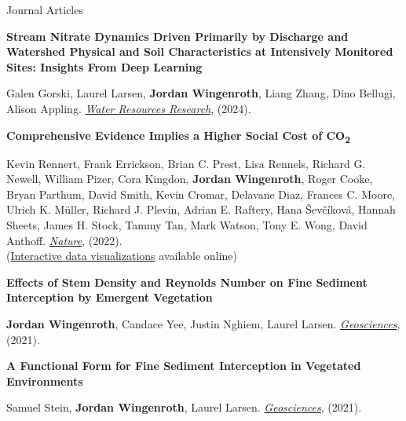 \documentclass{resume} %
\begin{document}
\begin{rSection}{Journal Articles}

{\bf Stream Nitrate Dynamics Driven Primarily by Discharge and Watershed Physical and Soil Characteristics at Intensively Monitored Sites: Insights From Deep Learning}
\vspace{-7pt}
\begin{adjustwidth}{12pt}{}
{\small Galen Gorski, Laurel Larsen, \textbf{Jordan Wingenroth}, Liang Zhang, Dino Bellugi, Alison Appling. \textit{\href{https://agupubs.onlinelibrary.wiley.com/doi/full/10.1029/2023WR036591}{Water Resources Research}}, (2024).}
\end{adjustwidth}

{\bf Comprehensive Evidence Implies a Higher Social Cost of CO\textsubscript{2}}
\vspace{-7pt}
\begin{adjustwidth}{12pt}{}
{\small Kevin Rennert, Frank Errickson, Brian C. Prest, Lisa Rennels, Richard G. Newell, William Pizer, Cora Kingdon, \textbf{Jordan Wingenroth}, Roger Cooke, Bryan Parthum, David Smith, Kevin Cromar, Delavane Diaz, Frances C. Moore, Ulrich K. M\"{u}ller, Richard J. Plevin, Adrian E. Raftery, Hana \v{S}ev\v{c}\'{i}kov\'{a}, Hannah Sheets, James H. Stock, Tammy Tan, Mark Watson, Tony E. Wong, David Anthoff. \textit{\href{https://www.nature.com/articles/s41586-022-05224-9}{Nature}}, (2022).\\
(\href{https://www.rff.org/publications/data-tools/scc-explorer/}{Interactive data visualizations} available online)}
\end{adjustwidth}

{\bf Effects of Stem Density and Reynolds Number on Fine Sediment Interception by Emergent Vegetation}
\vspace{-7pt}
\begin{adjustwidth}{12pt}{}
{\small \textbf{Jordan Wingenroth}, Candace Yee, Justin Nghiem, Laurel Larsen. \textit{\href{https://www.mdpi.com/2076-3263/11/3/136}{Geosciences}}, (2021).}
\end{adjustwidth}

{\bf A Functional Form for Fine Sediment Interception in Vegetated Environments}
\vspace{-7pt}
\begin{adjustwidth}{12pt}{}
{\small Samuel Stein, \textbf{Jordan Wingenroth}, Laurel Larsen. \textit{\href{https://www.mdpi.com/2076-3263/11/4/157}{Geosciences}}, (2021).}
\end{adjustwidth}

\end{rSection}
\end{document}
